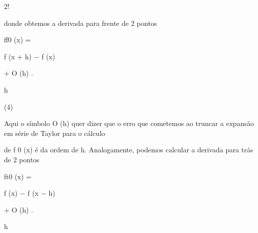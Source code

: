 \documentclass[a4paper,portrait,12pt]{article}
\begin{document}
2!





\begin{flushleft}
donde obtemos a derivada para frente de 2 pontos
\end{flushleft}


\begin{flushleft}
ff0 (x) =
\end{flushleft}





\begin{flushleft}
f (x + h) $-$ f (x)
\end{flushleft}


\begin{flushleft}
+ O (h) .
\end{flushleft}


\begin{flushleft}
h
\end{flushleft}





(4)





\begin{flushleft}
Aqui o s\'{i}mbolo O (h) quer dizer que o erro que cometemos ao truncar a expans\~{a}o em s\'{e}rie de Taylor para o c\'{a}lculo
\end{flushleft}


\begin{flushleft}
de f 0 (x) \'{e} da ordem de h. Analogamente, podemos calcular a derivada para tr\'{a}s de 2 pontos
\end{flushleft}


\begin{flushleft}
ft0 (x) =
\end{flushleft}





\begin{flushleft}
f (x) $-$ f (x $-$ h)
\end{flushleft}


\begin{flushleft}
+ O (h) .
\end{flushleft}


\begin{flushleft}
h
\end{flushleft}
\end{document}
